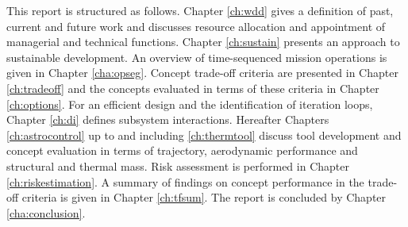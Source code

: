 This report is structured as follows. Chapter \ref{ch:wdd} gives a definition of past, current and future work and discusses resource allocation and appointment of managerial and technical functions. Chapter \ref{ch:sustain} presents an approach to sustainable development. An overview of time-sequenced mission operations is given in Chapter \ref{cha:opseg}. Concept trade-off criteria are presented in Chapter \ref{ch:tradeoff} and the concepts evaluated in terms of these criteria in Chapter \ref{ch:options}. For an efficient design and the identification of iteration loops, Chapter \ref{ch:di} defines subsystem interactions. Hereafter Chapters \ref{ch:astrocontrol} up to and including \ref{ch:thermtool} discuss tool development and concept evaluation in terms of trajectory, aerodynamic performance and structural and thermal mass. Risk assessment is performed in Chapter \ref{ch:riskestimation}. A summary of findings on concept performance in the trade-off criteria is given in Chapter \ref{ch:tfsum}. The report is concluded by Chapter \ref{cha:conclusion}.





